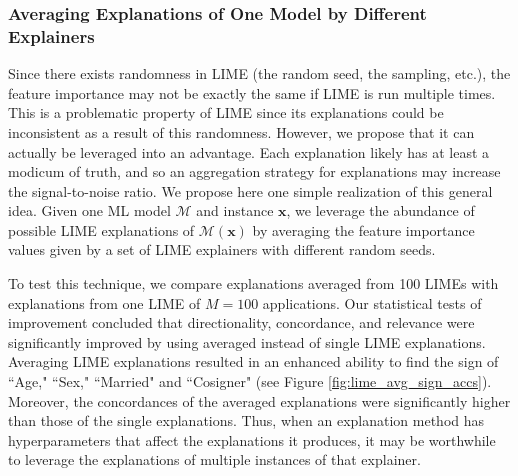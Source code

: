 \documentclass[mnsc,blindrev]{informs3}
\begin{document}
            \subsubsection{Averaging Explanations of One Model by Different Explainers}
            \label{sec:averaging_one_explainer}
            Since there exists randomness in LIME (the random seed, the sampling, etc.), the feature importance may not be exactly the same if LIME is run multiple times. This is a problematic property of LIME since its explanations could be inconsistent \citep{alvarez18robustness} as a result of this randomness. 
        However, we propose that it can actually be leveraged into an advantage. Each explanation likely has at least a modicum of truth, and so an aggregation strategy for explanations may increase the signal-to-noise ratio. We propose here one simple realization of this general idea. Given one ML model $\mathcal{M}$ and instance $\mathbf{x}$, we leverage the abundance of possible LIME explanations of $\mathcal{M}(\mathbf{x})$ by averaging the feature importance values given by a set of LIME explainers with different random seeds.
        
            To test this technique, we compare explanations averaged from 100 LIMEs with explanations from one LIME of $M=100$ applications. %
            Our statistical tests of improvement concluded that directionality, concordance, and relevance were significantly improved by using averaged instead of single LIME explanations. Averaging LIME explanations resulted in an enhanced ability to find the sign of ``Age," ``Sex," ``Married" and ``Cosigner" (see Figure \ref{fig:lime_avg_sign_accs}). %
            Moreover, the concordances of the averaged explanations were significantly higher than those of the single explanations. Thus, when an explanation method has hyperparameters that affect the explanations it produces, it may be worthwhile to leverage the explanations of multiple instances of that explainer.%
\end{document}
